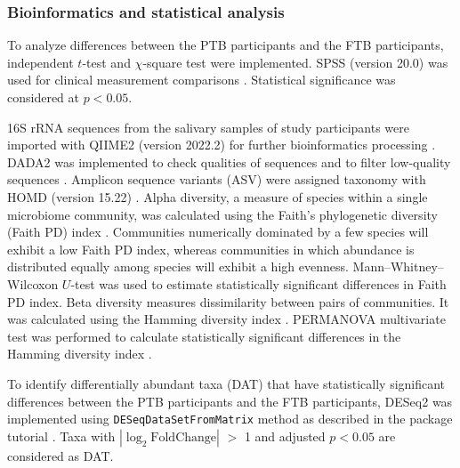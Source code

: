 \documentclass[11pt, a4paper, onecolumn, oneside]{report}
\begin{document}
            \subsubsection{Bioinformatics and statistical analysis}
                To analyze differences between the PTB participants and the FTB participants, independent $t$-test and $\chi$-square test were implemented. SPSS (version 20.0) was used for clinical measurement comparisons \cite{SPSS-1}. Statistical significance was considered at $p < 0.05$.

                16S rRNA sequences from the salivary samples of study participants were imported with QIIME2 (version 2022.2) for further bioinformatics processing \cite{QIIME2-1}. DADA2 was implemented to check qualities of sequences and to filter low-quality sequences \cite{DADA2-1}. Amplicon sequence variants (ASV) were assigned taxonomy with HOMD (version 15.22) \cite{HOMD-1}. Alpha diversity, a measure of species within a single microbiome community, was calculated using the Faith’s phylogenetic diversity (Faith PD) index \cite{FaithPD-1}. Communities numerically dominated by a few species will exhibit a low Faith PD index, whereas communities in which abundance is distributed equally among species will exhibit a high evenness. Mann–Whitney–Wilcoxon $U$-test was used to estimate statistically significant differences in Faith PD index. Beta diversity measures dissimilarity between pairs of communities. It was calculated using the Hamming diversity index \cite{Hamming-1}. PERMANOVA multivariate test was performed to calculate statistically significant differences in the Hamming diversity index \cite{PERMANOVA-1, PERMANOVA-2}.

                To identify differentially abundant taxa (DAT) that have statistically significant differences between the PTB participants and the FTB participants, DESeq2 was implemented using \texttt{DESeqDataSetFromMatrix} method as described in the package tutorial \cite{DESeq2-1}. Taxa with $| \log _2 \textrm{FoldChange} |$ $>$ 1 and adjusted $p < 0.05$ are considered as DAT.
\end{document}
